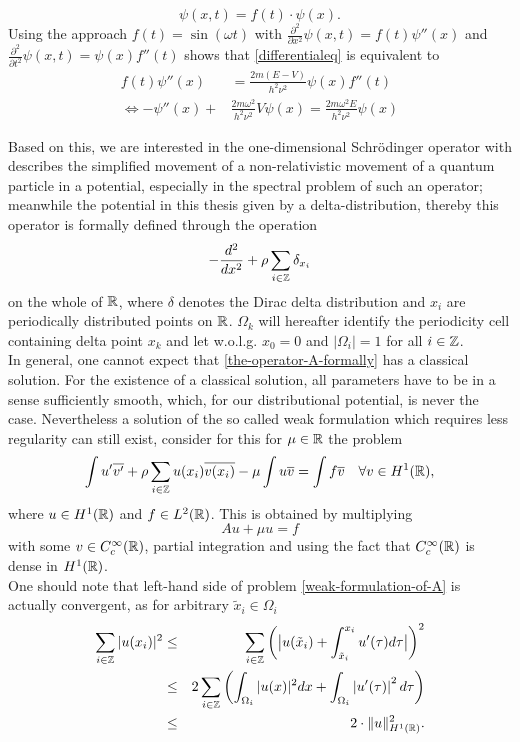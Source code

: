 		\[ \psi(x, t) = f(t) \cdot \psi(x). \]
	Using the approach $f(t) = \sin(\omega t)$ with $\frac{\partial^{2}}{\partial x^{2}} \psi(x, t) = f(t) \psi''(x)$ and $\frac{\partial^{2}}{\partial t^{2}} \psi(x, t) = \psi(x) f''(t)$ shows that \eqref{differentialeq} is equivalent to
	\begin{align*}
		f(t) \psi''(x) & = \frac{2m (E - V)}{h^{2} \nu^{2}} \psi(x) f''(t) \\
		\iff - \psi''(x) + & \frac{2m\omega^{2}}{h^{2} \nu^{2}} V \psi(x) = \frac{2m \omega^{2}E}{h^{2} \nu^{2}} \psi(x) 
	\end{align*}

Based on this, we are interested in the one-dimensional Schrödinger operator with describes the simplified movement of a non-relativistic movement of a quantum particle in a potential, especially in the spectral problem of such an operator; meanwhile the potential in this thesis given by a delta-distribution, thereby this operator is formally defined through the operation
\begin{equation}
	- \frac{d^{2}}{dx^{2}} + \rho \sum_{i \in \mathbb{Z}} \delta_{x_{i}} \label{the-operator-A-formally}
\end{equation}
on the whole of $\mathbb{R}$, where $\delta$ denotes the Dirac delta distribution and $x_{i}$ are periodically distributed points on $\mathbb{R}$. $\Omega_{k}$ will hereafter identify the periodicity cell containing delta point $x_{k}$ and let w.o.l.g. $x_{0} = 0$ and $|\Omega_{i}| = 1$ for all $i \in \mathbb{Z}$. \\

In general, one cannot expect that \eqref{the-operator-A-formally} has a classical
solution. For the existence of a classical solution, all parameters have to be in a sense sufficiently smooth, which, for our distributional potential, is never the case. Nevertheless a solution of the so called weak formulation which requires less regularity can still exist, consider for this for $\mu \in \mathbb{R}$ the problem
\begin{equation}
	\int u' \overline{v'} + \rho \sum_{i \in \mathbb{Z}} u(x_{i}) \overline{v(x_{i})} - \mu \int u \overline{v} = \int f \overline{v} \quad \forall v \in H^{1}(\mathbb{R}), \label{weak-formulation-of-A}
\end{equation}	
where $u \in H^{1}(\mathbb{R})$ and $f \in L^{2}(\mathbb{R})$. This is obtained by multiplying
	\[ Au + \mu u = f \]
with some $v \in C_{c}^{\infty}(\mathbb{R})$, partial integration and using the fact that $C_{c}^{\infty}(\mathbb{R})$ is dense in $H^{1}(\mathbb{R})$. \\
	
One should note that left-hand side of problem \eqref{weak-formulation-of-A} is actually convergent, as for arbitrary $\tilde{x}_{i} \in \Omega_{i}$
\begin{eqnarray}
	\sum_{i \in \mathbb{Z}} |u(x_{i})|^{2} & \leq & \sum_{i \in \mathbb{Z}} \left( \big| u(\tilde{x}_{i}) + \int_{\tilde{x}_{i}}^{x_{i}} u'( \tau ) d\tau \big| \right)^{2} \notag \\
		 & \leq & 2 \sum_{i \in \mathbb{Z}} \left( \int_{\Omega_{i}} |u( x )|^{2} dx +  \int_{\Omega_{i}} \left| u'(\tau) \right|^{2} d\tau \right) \notag \\
		 & \leq & 2 \cdot \| u \|^{2}_{H^{1}(\mathbb{R})}. \label{estimation-for-potential}
\end{eqnarray}